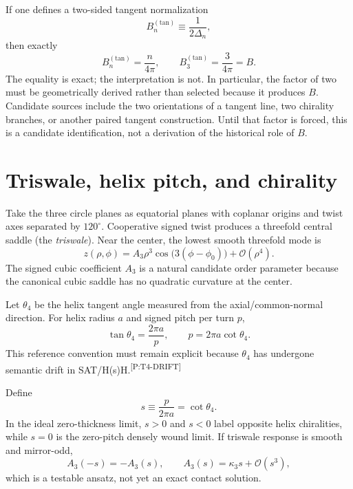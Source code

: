 \documentclass[11pt]{article}
\newcommand{\HsH}{H(s)H\xspace}
\newcommand{\mcite}[1]{\textsuperscript{\tiny\textsf{[#1]}}}
\begin{document}
If one defines a two-sided tangent normalization
\begin{equation}
B_n^{(\mathrm{tan})}\equiv\frac{1}{2\Delta_n},
\end{equation}
then exactly
\begin{equation}
B_n^{(\mathrm{tan})}=\frac{n}{4\pi},\qquad
B_3^{(\mathrm{tan})}=\frac{3}{4\pi}=B.
\end{equation}
The equality is exact; the interpretation is not. In particular, the factor of two must be geometrically derived rather than selected because it produces $B$. Candidate sources include the two orientations of a tangent line, two chirality branches, or another paired tangent construction. Until that factor is forced, this is a candidate identification, not a derivation of the historical role of $B$.

\section{Triswale, helix pitch, and chirality}

Take the three circle planes as equatorial planes with coplanar origins and twist axes separated by $120^\circ$. Cooperative signed twist produces a threefold central saddle (the \emph{triswale}). Near the center, the lowest smooth threefold mode is
\begin{equation}
z(\rho,\phi)=A_3\rho^3\cos\bigl(3(\phi-\phi_0)\bigr)+\mathcal O(\rho^4).
\end{equation}
The signed cubic coefficient $A_3$ is a natural candidate order parameter because the canonical cubic saddle has no quadratic curvature at the center.

Let $\theta_4$ be the helix tangent angle measured from the axial/common-normal direction. For helix radius $a$ and signed pitch per turn $p$,
\begin{equation}
\tan\theta_4=\frac{2\pi a}{p},\qquad p=2\pi a\cot\theta_4.
\end{equation}
This reference convention must remain explicit because $\theta_4$ has undergone semantic drift in SAT/\HsH.\mcite{P:T4-DRIFT}

Define
\begin{equation}
s\equiv\frac{p}{2\pi a}=\cot\theta_4.
\end{equation}
In the ideal zero-thickness limit, $s>0$ and $s<0$ label opposite helix chiralities, while $s=0$ is the zero-pitch densely wound limit. If triswale response is smooth and mirror-odd,
\begin{equation}
A_3(-s)=-A_3(s),\qquad A_3(s)=\kappa_3s+\mathcal O(s^3),
\end{equation}
which is a testable ansatz, not yet an exact contact solution.
\end{document}
